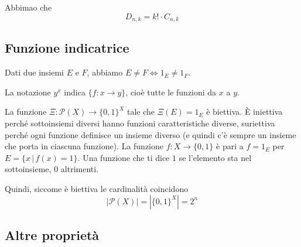 \documentclass[a4paper]{article}
\begin{document}

Abbimao che
\[
    D_{n,k} = k! \cdot C_{n,k}
\]


\pagebreak



\subsection{Funzione indicatrice}

Dati due insiemi \(E\) e \(F\), abbiamo \(E \neq F \iff 1_E \neq 1_F\).

La notazione \(y^x\) indica \(\{ f\colon x \to y \}\), cioè tutte le funzioni da \(x\) a \(y\).

La funzione \(\Xi \colon \mathcal{P}(X) \to {\{ 0,1 \}}^X\) tale che
\(\Xi(E) = 1_E\) è biettiva.
È iniettiva perché sottoinsiemi diversi hanno funzioni caratteristiche diverse,
suriettiva perché ogni funzione definisce un insieme diverso (e quindi c'è sempre un insieme che porta in ciascuna funzione).
La funzione \(f\colon X \to \{0,1\}\) è pari a \(f=1_E\) per
\(E = \{ x \,|\, f(x)=1 \}\).
Una funzione che ti dice \(1\) se l'elemento sta nel sottoinsieme, 0 altrimenti.

Quindi, siccome è biettiva le cardinalità coincidono \[ |\mathcal{P}(X)| = |{\{0,1\}}^X| = 2^n \]

\subsection{Altre proprietà}
\end{document}
